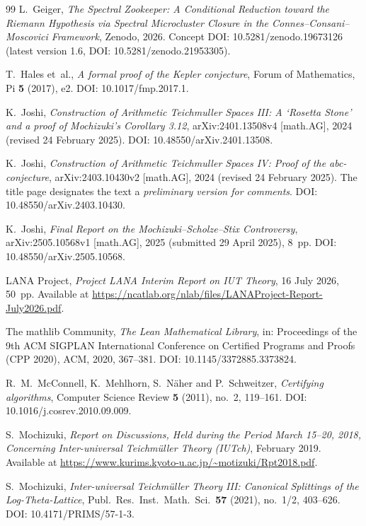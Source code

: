 \documentclass[11pt,a4paper]{article}
\begin{document}
\begin{thebibliography}{99}
L.~Geiger,
\emph{The Spectral Zookeeper: A Conditional Reduction toward the
Riemann Hypothesis via Spectral Microcluster Closure in the
Connes--Consani--Moscovici Framework},
Zenodo, 2026.
Concept DOI: 10.5281/zenodo.19673126
(latest version 1.6, DOI: 10.5281/zenodo.21953305).

T.~Hales et~al.,
\emph{A formal proof of the Kepler conjecture},
Forum of Mathematics, Pi \textbf{5} (2017), e2.
DOI: 10.1017/fmp.2017.1.

K.~Joshi,
\emph{Construction of Arithmetic Teichmuller Spaces III: A `Rosetta
Stone' and a proof of Mochizuki's Corollary 3.12},
arXiv:2401.13508v4 [math.AG], 2024 (revised 24 February 2025).
DOI: 10.48550/arXiv.2401.13508.

K.~Joshi,
\emph{Construction of Arithmetic Teichmuller Spaces IV: Proof of the
abc-conjecture},
arXiv:2403.10430v2 [math.AG], 2024 (revised 24 February 2025).
The title page designates the text a \emph{preliminary version for
comments}.
DOI: 10.48550/arXiv.2403.10430.

K.~Joshi,
\emph{Final Report on the Mochizuki--Scholze--Stix Controversy},
arXiv:2505.10568v1 [math.AG], 2025 (submitted 29 April 2025), 8~pp.
DOI: 10.48550/arXiv.2505.10568.

LANA Project,
\emph{Project LANA Interim Report on IUT Theory},
16 July 2026, 50~pp.
Available at
\url{https://ncatlab.org/nlab/files/LANAProject-Report-July2026.pdf}.

The mathlib Community,
\emph{The Lean Mathematical Library},
in: Proceedings of the 9th ACM SIGPLAN International Conference on
Certified Programs and Proofs (CPP 2020), ACM, 2020, 367--381.
DOI: 10.1145/3372885.3373824.

R.~M.~McConnell, K.~Mehlhorn, S.~Näher and P.~Schweitzer,
\emph{Certifying algorithms},
Computer Science Review \textbf{5} (2011), no.~2, 119--161.
DOI: 10.1016/j.cosrev.2010.09.009.

S.~Mochizuki,
\emph{Report on Discussions, Held during the Period March 15--20, 2018,
Concerning Inter-universal Teichmüller Theory (IUTch)},
February 2019.
Available at
\url{https://www.kurims.kyoto-u.ac.jp/~motizuki/Rpt2018.pdf}.

S.~Mochizuki,
\emph{Inter-universal Teichmüller Theory III: Canonical Splittings
of the Log-Theta-Lattice},
Publ.\ Res.\ Inst.\ Math.\ Sci.\ \textbf{57} (2021), no.~1/2, 403--626.
DOI: 10.4171/PRIMS/57-1-3.


\end{thebibliography}
\end{document}
